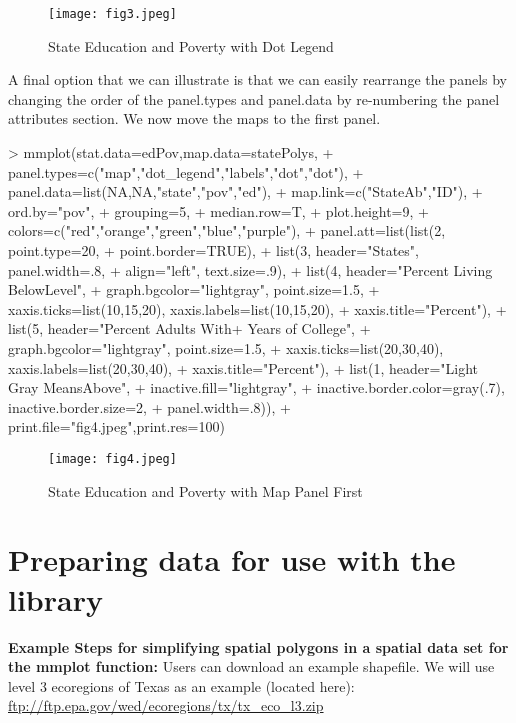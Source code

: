 \documentclass{article}
\begin{document}
\begin{figure}[!tbp] 
\begin{center} 
\texttt{[image: fig3.jpeg]}
  \caption{State Education and Poverty with Dot Legend}
  \label{fig3} 
\end{center} 
\end{figure}
A final option that we can illustrate is that we can easily rearrange the panels by changing the order of the panel.types and panel.data by re-numbering the panel attributes section.  We now move the maps to the first panel.
\begin{Schunk}
\begin{Sinput}
> mmplot(stat.data=edPov,map.data=statePolys,
+ panel.types=c("map","dot_legend","labels","dot","dot"),
+ panel.data=list(NA,NA,"state","pov","ed"),
+ map.link=c("StateAb","ID"),
+ ord.by="pov", 
+ grouping=5, 
+ median.row=T,
+ plot.height=9, 
+ colors=c("red","orange","green","blue","purple"),
+ panel.att=list(list(2, point.type=20,
+ point.border=TRUE),
+ list(3, header="States", panel.width=.8, 
+ align="left", text.size=.9),
+ list(4, header="Percent Living Below\nPoverty Level",
+ graph.bgcolor="lightgray", point.size=1.5,
+ xaxis.ticks=list(10,15,20), xaxis.labels=list(10,15,20),
+ xaxis.title="Percent"),
+ list(5, header="Percent Adults With+ Years of College",
+ graph.bgcolor="lightgray", point.size=1.5,
+ xaxis.ticks=list(20,30,40), xaxis.labels=list(20,30,40), 
+ xaxis.title="Percent"),
+ list(1, header="Light Gray Means\nHighlighted Above",
+ inactive.fill="lightgray",     
+ inactive.border.color=gray(.7), inactive.border.size=2, 
+ panel.width=.8)),
+ print.file="fig4.jpeg",print.res=100)
\end{Sinput}
\end{Schunk}
\begin{figure}[!tbp] 
\begin{center} 
\texttt{[image: fig4.jpeg]} 
  \caption{State Education and Poverty with Map Panel First}
  \label{fig4} 
\end{center} 
\end{figure}

\section{Preparing data for use with the library}
\textbf{Example Steps for simplifying spatial polygons in a spatial data set for the mmplot function:}
Users can download an example shapefile.  We will use level 3 ecoregions of Texas as an example (located here):\\
\url{ftp://ftp.epa.gov/wed/ecoregions/tx/tx_eco_l3.zip}\\
\end{document}
